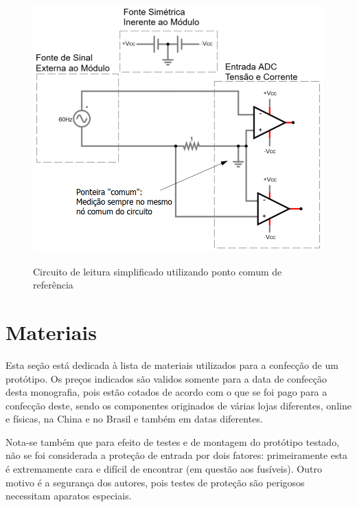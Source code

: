 \begin{figure}[h!]
    \centering
    \caption{Circuito de leitura simplificado utilizando ponto comum de referência}
    \includegraphics[width=\textwidth, height=\textheight, keepaspectratio]{figuras/diferencial-ponto-comum.png}
    \label{fig:ponto-comum}
    \fonte{}
\end{figure}

\section{Materiais}\label{sec:materiais}

Esta seção está dedicada à lista de materiais utilizados para a confecção de um protótipo. Os preços indicados são validos somente para a data de confecção desta monografia, pois estão cotados de acordo com o que se foi pago para a confecção deste, sendo os componentes originados de várias lojas diferentes, online e físicas, na China e no Brasil e também em datas diferentes.

Nota-se também que para efeito de testes e de montagem do protótipo testado, não se foi considerada a proteção de entrada por dois fatores: primeiramente esta é extremamente cara e difícil de encontrar (em questão aos fusíveis). Outro motivo é a segurança dos autores, pois testes de proteção são perigosos necessitam aparatos especiais.

